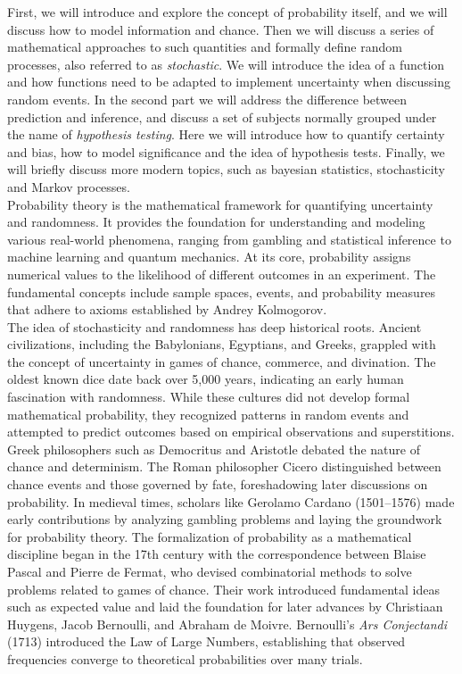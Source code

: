 \documentclass{book}
\begin{document}
First, we will introduce and explore the concept of probability itself, and we will discuss how to model information and chance. Then we will discuss a series of mathematical approaches to such quantities and formally define random processes, also referred to as \textit{stochastic}. We will introduce the idea of a function and how functions need to be adapted to implement uncertainty when discussing random events. In the second part we will address the difference between prediction and inference, and discuss a set of subjects normally grouped under the name of \textit{hypothesis testing}. Here we will introduce how to quantify certainty and bias, how to model significance and the idea of hypothesis tests. Finally, we will briefly discuss more modern topics, such as bayesian statistics, stochasticity and Markov processes.\\

Probability theory is the mathematical framework for quantifying uncertainty and randomness. It provides the foundation for understanding and modeling various real-world phenomena, ranging from gambling and statistical inference to machine learning and quantum mechanics. At its core, probability assigns numerical values to the likelihood of different outcomes in an experiment. The fundamental concepts include sample spaces, events, and probability measures that adhere to axioms established by Andrey Kolmogorov.\\

The idea of stochasticity and randomness has deep historical roots. Ancient civilizations, including the Babylonians, Egyptians, and Greeks, grappled with the concept of uncertainty in games of chance, commerce, and divination. The oldest known dice date back over 5,000 years, indicating an early human fascination with randomness. While these cultures did not develop formal mathematical probability, they recognized patterns in random events and attempted to predict outcomes based on empirical observations and superstitions.
Greek philosophers such as Democritus and Aristotle debated the nature of chance and determinism. The Roman philosopher Cicero distinguished between chance events and those governed by fate, foreshadowing later discussions on probability. In medieval times, scholars like Gerolamo Cardano (1501–1576) made early contributions by analyzing gambling problems and laying the groundwork for probability theory.
The formalization of probability as a mathematical discipline began in the 17th century with the correspondence between Blaise Pascal and Pierre de Fermat, who devised combinatorial methods to solve problems related to games of chance. Their work introduced fundamental ideas such as expected value and laid the foundation for later advances by Christiaan Huygens, Jacob Bernoulli, and Abraham de Moivre. Bernoulli’s \textit{Ars Conjectandi} (1713) introduced the Law of Large Numbers, establishing that observed frequencies converge to theoretical probabilities over many trials.\\
\end{document}
